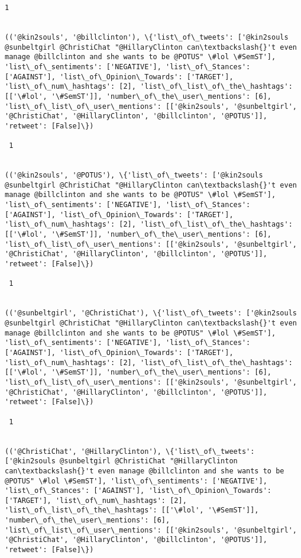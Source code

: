 \documentclass[11pt]{article}
\begin{document}
\begin{Verbatim}[commandchars=\\\{\}]
 1
 

(('@kin2souls', '@billclinton'), \{'list\_of\_tweets': ['@kin2souls @sunbeltgirl @ChristiChat "@HillaryClinton can\textbackslash{}'t even manage @billclinton and she wants to be @POTUS" \#lol \#SemST'], 'list\_of\_sentiments': ['NEGATIVE'], 'list\_of\_Stances': ['AGAINST'], 'list\_of\_Opinion\_Towards': ['TARGET'], 'list\_of\_num\_hashtags': [2], 'list\_of\_list\_of\_the\_hashtags': [['\#lol', '\#SemST']], 'number\_of\_the\_user\_mentions': [6], 'list\_of\_list\_of\_user\_mentions': [['@kin2souls', '@sunbeltgirl', '@ChristiChat', '@HillaryClinton', '@billclinton', '@POTUS']], 'retweet': [False]\})

 1
 

(('@kin2souls', '@POTUS'), \{'list\_of\_tweets': ['@kin2souls @sunbeltgirl @ChristiChat "@HillaryClinton can\textbackslash{}'t even manage @billclinton and she wants to be @POTUS" \#lol \#SemST'], 'list\_of\_sentiments': ['NEGATIVE'], 'list\_of\_Stances': ['AGAINST'], 'list\_of\_Opinion\_Towards': ['TARGET'], 'list\_of\_num\_hashtags': [2], 'list\_of\_list\_of\_the\_hashtags': [['\#lol', '\#SemST']], 'number\_of\_the\_user\_mentions': [6], 'list\_of\_list\_of\_user\_mentions': [['@kin2souls', '@sunbeltgirl', '@ChristiChat', '@HillaryClinton', '@billclinton', '@POTUS']], 'retweet': [False]\})

 1
 

(('@sunbeltgirl', '@ChristiChat'), \{'list\_of\_tweets': ['@kin2souls @sunbeltgirl @ChristiChat "@HillaryClinton can\textbackslash{}'t even manage @billclinton and she wants to be @POTUS" \#lol \#SemST'], 'list\_of\_sentiments': ['NEGATIVE'], 'list\_of\_Stances': ['AGAINST'], 'list\_of\_Opinion\_Towards': ['TARGET'], 'list\_of\_num\_hashtags': [2], 'list\_of\_list\_of\_the\_hashtags': [['\#lol', '\#SemST']], 'number\_of\_the\_user\_mentions': [6], 'list\_of\_list\_of\_user\_mentions': [['@kin2souls', '@sunbeltgirl', '@ChristiChat', '@HillaryClinton', '@billclinton', '@POTUS']], 'retweet': [False]\})

 1
 

(('@ChristiChat', '@HillaryClinton'), \{'list\_of\_tweets': ['@kin2souls @sunbeltgirl @ChristiChat "@HillaryClinton can\textbackslash{}'t even manage @billclinton and she wants to be @POTUS" \#lol \#SemST'], 'list\_of\_sentiments': ['NEGATIVE'], 'list\_of\_Stances': ['AGAINST'], 'list\_of\_Opinion\_Towards': ['TARGET'], 'list\_of\_num\_hashtags': [2], 'list\_of\_list\_of\_the\_hashtags': [['\#lol', '\#SemST']], 'number\_of\_the\_user\_mentions': [6], 'list\_of\_list\_of\_user\_mentions': [['@kin2souls', '@sunbeltgirl', '@ChristiChat', '@HillaryClinton', '@billclinton', '@POTUS']], 'retweet': [False]\})


\end{Verbatim}
\end{document}
